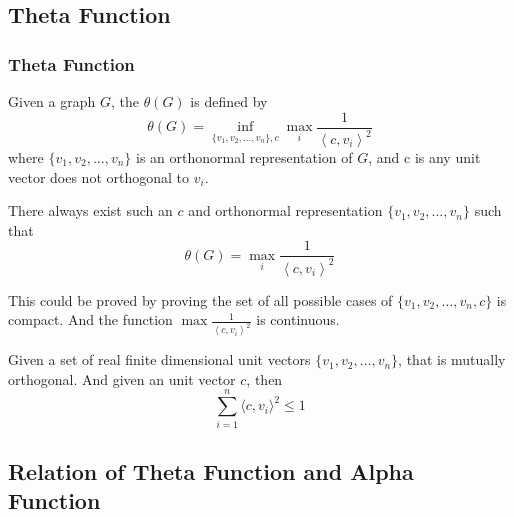 \subsection{Theta Function}

      \begin{frame}
            \frametitle{Theta Function}
            Given a graph $ G $, the $ \theta(G) $ is defined by
            \begin{equation}
                  \theta(G) = \inf_{\{v_1, v_2, \dots, v_n\},c} \max_{i} \frac{1}{\left<c,v_{i}\right>^2}
            \end{equation}
            where $ \{v_1, v_2, \dots, v_n\} $ is an orthonormal representation of $ G $, and c is any unit vector does not orthogonal to $ v_i $.

            \pause

            \begin{lemma}
                  There always exist such an $c$ and orthonormal representation $ \{v_1, v_2, \dots, v_n\} $ such that
                  \begin{equation}
                        \theta(G) = \max_{i} \frac{1}{\left<c,v_{i}\right>^2}
                  \end{equation}
            \end{lemma}

            This could be proved by proving the set of all possible cases of $ \{v_1, v_2, \dots, v_n,c \} $ is compact. And the function $ \max \frac{1}{\left<c,v_{i}\right>^2} $ is continuous.
      \end{frame}

      \begin{frame}
            \begin{lemma}
                  Given a set of real finite dimensional unit vectors $\{v_{1},v_{2},\hdots,v_{n}\}$, that is mutually orthogonal.
                  And given an unit vector $c$, then
                  \begin{equation}
                        \sum_{i=1}^{n} \langle c, v_{i} \rangle ^ {2} \le 1
                  \end{equation}
            \end{lemma}
      \end{frame}

\subsection*{Relation of Theta Function and Alpha Function}

